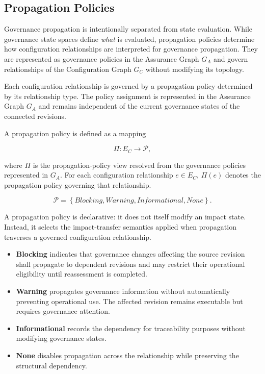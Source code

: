 \documentclass[10pt]{article}
\begin{document}
\subsection{Propagation Policies}
\label{sec:propagation_policies}

Governance propagation is intentionally separated from state evaluation. While governance state spaces define \emph{what} is evaluated, propagation policies determine how configuration relationships are interpreted for governance propagation. They are represented as governance policies in the Assurance Graph $G_A$ and govern relationships of the Configuration Graph $G_C$ without modifying its topology.

Each configuration relationship is governed by a propagation policy determined by its relationship type. The policy assignment is represented in the Assurance Graph $G_A$ and remains independent of the current governance states of the connected revisions.

A propagation policy is defined as a mapping

\begin{equation}
	\Pi:E_C\rightarrow\mathcal P,
	\label{eq:policy_mapping}
\end{equation}

where $\Pi$ is the propagation-policy view resolved from the governance policies represented in $G_A$. For each configuration relationship $e\in E_C$, $\Pi(e)$ denotes the propagation policy governing that relationship.

\begin{equation}
	\mathcal{P}=
	\left\{
	\textit{Blocking},
	\textit{Warning},
	\textit{Informational},
	\textit{None}
	\right\}.
	\label{eq:policy_space}
\end{equation}

A propagation policy is declarative: it does not itself modify an impact state. Instead, it selects the impact-transfer semantics applied when propagation traverses a governed configuration relationship.

\begin{itemize}
	\item \textbf{Blocking} indicates that governance changes affecting the source revision shall propagate to dependent revisions and may restrict their operational eligibility until reassessment is completed.
	
	\item \textbf{Warning} propagates governance information without automatically preventing operational use. The affected revision remains executable but requires governance attention.
	
	\item \textbf{Informational} records the dependency for traceability purposes without modifying governance states.
	
	\item \textbf{None} disables propagation across the relationship while preserving the structural dependency.
\end{itemize}
\end{document}

